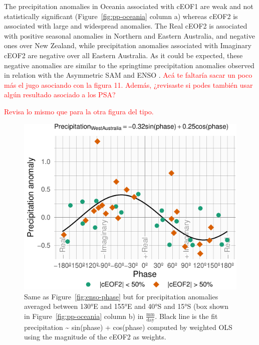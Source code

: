 \documentclass[smallextended]{svjour3}       %
\begin{document}
The precipitation anomalies in Oceania associated with cEOF1 are weak and not statistically significant (Figure~\ref{fig:pp-oceania} column a) whereas cEOF2 is associated with large and widespread anomalies. The Real cEOF2 is associated with positive seasonal anomalies in Northern and Eastern Australia, and negative ones over New Zealand, while precipitation anomalies associated with Imaginary cEOF2 are negative over all Eastern Australia. As it could be expected, these negative anomalies are similar to the springtime precipitation anomalies observed in relation with the Asymmetric SAM \citep{campitelli2021} and ENSO \citep{cai2011}.
\textcolor{red}{Acá te faltaría  sacar un poco más el jugo asociando con la figura 11. Además, ¿revisaste si podes también usar algún resultado asociado a los PSA? }



\textcolor{red}{Revisa lo mismo que para la otra figura del tipo. }

\begin{figure}
\centering
\includegraphics{../figures/australia-pp-phase-1.pdf}
\caption{\label{fig:australia-pp-phase}Same as Figure~\ref{fig:enso-phase} but for precipitation anomalies averaged between 130°E and 155°E and 40°S and 15°S (box shown in Figure~\ref{fig:pp-oceania} column b) in \(\frac{\mathrm{mm}}{\mathrm{day}}\). Black line is the fit precipitation \textasciitilde{} sin(phase) + cos(phase) computed by weighted OLS using the magnitude of the cEOF2 as weights.}
\end{figure}
\end{document}
